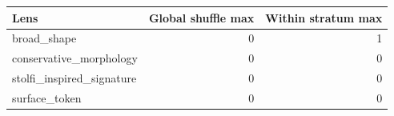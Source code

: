 {\small
\begin{tabular}{lrr}
\toprule
Lens & Global shuffle max & Within stratum max \\
\midrule
broad\_shape & 0 & 1 \\
conservative\_morphology & 0 & 0 \\
stolfi\_inspired\_signature & 0 & 0 \\
surface\_token & 0 & 0 \\
\bottomrule
\end{tabular}
}
